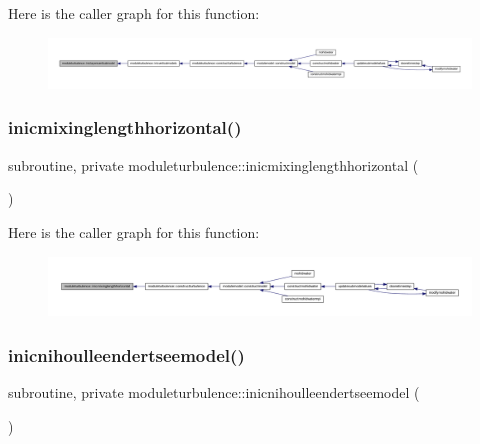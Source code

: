 Here is the caller graph for this function\+:\nopagebreak
\begin{figure}[H]
\begin{center}
\leavevmode
\includegraphics[width=350pt]{namespacemoduleturbulence_af52d9bce4123a146f0b750fab46833ee_icgraph}
\end{center}
\end{figure}
\mbox{\label{namespacemoduleturbulence_af1c597f7f366a455e6e36dbc70ea56b6}} 
\subsubsection{\texorpdfstring{inicmixinglengthhorizontal()}{inicmixinglengthhorizontal()}}
{\footnotesize\ttfamily subroutine, private moduleturbulence\+::inicmixinglengthhorizontal (\begin{DoxyParamCaption}{ }\end{DoxyParamCaption})\hspace{0.3cm}{\ttfamily [private]}}

Here is the caller graph for this function\+:\nopagebreak
\begin{figure}[H]
\begin{center}
\leavevmode
\includegraphics[width=350pt]{namespacemoduleturbulence_af1c597f7f366a455e6e36dbc70ea56b6_icgraph}
\end{center}
\end{figure}
\mbox{\label{namespacemoduleturbulence_a59fa0936c4e079b4094b7b50f09a8092}} 
\subsubsection{\texorpdfstring{inicnihoulleendertseemodel()}{inicnihoulleendertseemodel()}}
{\footnotesize\ttfamily subroutine, private moduleturbulence\+::inicnihoulleendertseemodel (\begin{DoxyParamCaption}{ }\end{DoxyParamCaption})\hspace{0.3cm}{\ttfamily [private]}}

